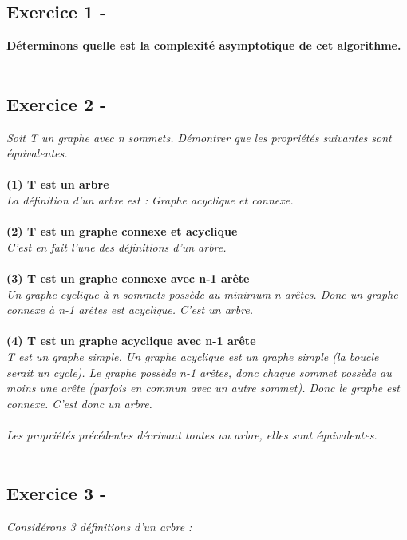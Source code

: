 \documentclass{article}
\begin{document}
\subsection*{Exercice 1 -}
	\textbf{Déterminons quelle est la complexité asymptotique de cet algorithme.}\\\\
\subsection*{Exercice 2 -}
	\textit{Soit T un graphe avec n sommets. Démontrer que les propriétés suivantes sont équivalentes.}\\\\
	\textbf{(1) T est un arbre}\\
	\textit{La définition d'un arbre est : Graphe acyclique et connexe.}\\\\
	\textbf{(2) T est un graphe connexe et acyclique}\\
	\textit{C'est en fait l'une des définitions d'un arbre.}\\\\
	\textbf{(3) T est un graphe connexe avec n-1 arête}\\
	\textit{Un graphe cyclique à n sommets possède au minimum n arêtes. Donc un graphe connexe à n-1 		arêtes est acyclique. C'est un arbre.}\\\\
	\textbf{(4) T est un graphe acyclique avec n-1 arête}\\
	\textit{T est un graphe simple. Un graphe acyclique est un graphe simple (la boucle serait un cycle). Le graphe possède n-1 arêtes, donc chaque sommet possède au moins une arête (parfois en commun avec un autre sommet). Donc le graphe est connexe. C'est donc un arbre.}\\\\
\textit{Les propriétés précédentes décrivant toutes un arbre, elles sont équivalentes.}\\\\
\subsection*{Exercice 3 -}
\textit{Considérons 3 définitions d'un arbre : }\\\\\\
\end{document}
